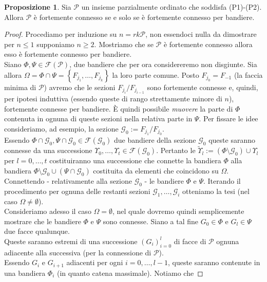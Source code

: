 \documentclass[a4paper,12pt]{report}
\newcommand{\p}{\mathcal{P}}
\theoremstyle{plain}
\theoremstyle{definition}
\newtheorem{prop}[teo]{Proposizione}
\begin{document}
\begin{prop}
\label{P3Flags}
Sia $\p$ un insieme parzialmente ordinato che soddisfa (P1)-(P2). Allora $\p$ \`e fortemente connesso se e solo se \`e fortemente
connesso per bandiere.
\end{prop}
\begin{proof}
Procediamo per induzione su $n=rk\p$, non essendoci nulla da dimostrare per $n\leq 1$ supponiamo $n\geq 2$. Mostriamo che se $\p$ \`e
fortemente connesso allora esso \`e fortemente connesso per bandiere.\\
Siano $\Phi,\Psi\in\mathcal{F}(\p)$, due bandiere che per ora considereremo non disgiunte. Sia allora $\Omega=\Phi\cap\Psi=\left\{F_{j_1},\dots,F_{j_k}\right\}$ 
la loro parte comune. Posto $F_{j_0}=F_{-1}$ (la faccia minima di $\p$) avremo che le sezioni $F_{j_i}/F_{j_{i-1}}$ sono fortemente connesse e, quindi,
per ipotesi induttiva (essendo queste di rango strettamente minore di $n$), fortemente connesse per bandiere. \`E quindi possibile \emph{muovere} la parte di
$\Phi$ contenuta in ognuna di queste sezioni nella relativa parte in $\Psi$. Per fissare le idee consideriamo, ad esempio, la sezione
$\mathcal{G}_0:=F_{j_1}/F_{j_0}$.\\
Essendo $\Phi\cap\mathcal{G}_0,\Psi\cap\mathcal{G}_0\in\mathcal{F}(\mathcal{G}_0)$ due bandiere della sezione $\mathcal{G}_0$ queste saranno connesse da una 
successione $\Upsilon_0,\dots,\Upsilon_t\in\mathcal{F}(\mathcal{G}_0)$. Pertanto le $\widetilde{\Upsilon}_l:=(\Phi\setminus\mathcal{G}_0)\cup\Upsilon_l$ per
$l=0,\dots,t$ costituiranno una successione che connette la bandiera $\Phi$ alla bandiera $\Phi\setminus\mathcal{G}_0\cup(\Psi\cap\mathcal{G}_0)$
costituita da elementi che coincidono su $\Omega$.
Connettendo - relativamente alla sezione $\mathcal{G}_0$ - le bandiere $\Phi$ e $\Psi$. Iterando il procedimento per ognuna delle restanti sezioni
$\mathcal{G}_1,\dots,\mathcal{G}_i$ otteniamo la tesi (nel caso $\Omega\ne\emptyset$).\\
Consideriamo adesso il caso $\Omega=\emptyset$, nel quale dovremo quindi semplicemente mostrare che le bandiere $\Phi$ e $\Psi$ sono connesse.
Siano a tal fine $G_0\in\Phi$ e $G_l\in\Psi$ due facce qualunque.\\
Queste saranno estremi di una successione $(G_i)_{i=0}^l$ di facce di $\p$
ognuna adiacente alla successiva (per la connessione di $\p$).\\
Essendo $G_i$ e $G_{i+1}$ adiacenti per ogni $i=0,\dots,l-1$, queste saranno contenute in una bandiera $\Phi_i$ (in quanto catena massimale). Notiamo che

\end{proof}
\end{document}
